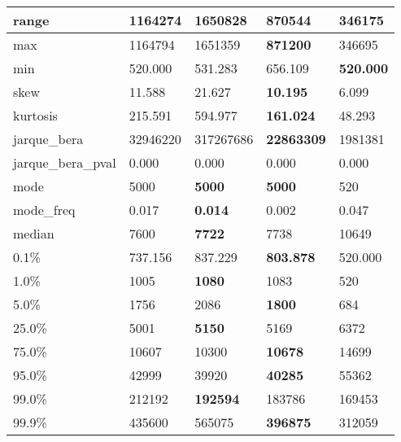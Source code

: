 \begin{table}[H]
\begin{tabular}{|l|m{10em}|m{10em}|m{10em}|m{10em}|}
\hline range & 1164274 & 1650828 & \bfseries 870544 & \cellcolor[rgb]{0.9, 0.54, 0.52} 346175 \\
\hline max & 1164794 & 1651359 & \bfseries 871200 & \cellcolor[rgb]{0.9, 0.54, 0.52} 346695 \\
\hline min & 520.000 & 531.283 & \cellcolor[rgb]{0.9, 0.54, 0.52} 656.109 & \bfseries 520.000 \\
\hline skew & 11.588 & \cellcolor[rgb]{0.9, 0.54, 0.52} 21.627 & \bfseries 10.195 & 6.099 \\
\hline kurtosis & 215.591 & \cellcolor[rgb]{0.9, 0.54, 0.52} 594.977 & \bfseries 161.024 & 48.293 \\
\hline jarque\_bera & 32946220 & \cellcolor[rgb]{0.9, 0.54, 0.52} 317267686 & \bfseries 22863309 & 1981381 \\
\hline jarque\_bera\_pval & 0.000 & 0.000 & 0.000 & 0.000 \\
\hline mode & 5000 & \bfseries 5000 & \bfseries 5000 & \cellcolor[rgb]{0.9, 0.54, 0.52} 520 \\
\hline mode\_freq & 0.017 & \bfseries 0.014 & 0.002 & \cellcolor[rgb]{0.9, 0.54, 0.52} 0.047 \\
\hline median & 7600 & \bfseries 7722 & 7738 & \cellcolor[rgb]{0.9, 0.54, 0.52} 10649 \\
\hline 0.1\% & 737.156 & 837.229 & \bfseries 803.878 & \cellcolor[rgb]{0.9, 0.54, 0.52} 520.000 \\
\hline 1.0\% & 1005 & \bfseries 1080 & 1083 & \cellcolor[rgb]{0.9, 0.54, 0.52} 520 \\
\hline 5.0\% & 1756 & 2086 & \bfseries 1800 & \cellcolor[rgb]{0.9, 0.54, 0.52} 684 \\
\hline 25.0\% & 5001 & \bfseries 5150 & 5169 & \cellcolor[rgb]{0.9, 0.54, 0.52} 6372 \\
\hline 75.0\% & 10607 & 10300 & \bfseries 10678 & \cellcolor[rgb]{0.9, 0.54, 0.52} 14699 \\
\hline 95.0\% & 42999 & 39920 & \bfseries 40285 & \cellcolor[rgb]{0.9, 0.54, 0.52} 55362 \\
\hline 99.0\% & 212192 & \bfseries 192594 & 183786 & \cellcolor[rgb]{0.9, 0.54, 0.52} 169453 \\
\hline 99.9\% & 435600 & \cellcolor[rgb]{0.9, 0.54, 0.52} 565075 & \bfseries 396875 & 312059 \\
\hline
\end{tabular}
\end{table}
